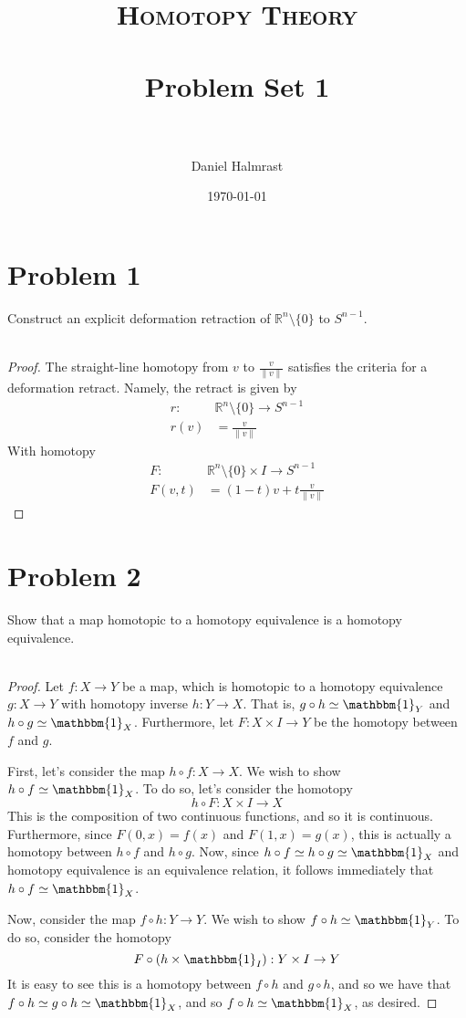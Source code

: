 \documentclass[fontsize=11pt]{scrartcl} %
\title{	
\normalfont \normalsize 
\textsc{Homotopy Theory} \\ [25pt] %
\horrule{0.5pt} \\[0.4cm] %
\huge Problem Set 1 \\ %
\horrule{2pt} \\[0.5cm] %
}
\author{Daniel Halmrast} %
\date{\normalsize\today} %
\numberwithin{equation}{section} %
\numberwithin{figure}{section} %
\numberwithin{table}{section} %
\newcommand{\R}{\mathbb{R}}
\begin{document}
\maketitle %

\section*{Problem 1} %
Construct an explicit deformation retraction of $\R^n\setminus \{0\}$ to
$S^{n-1}$.
\\
\\
\begin{proof}
    The straight-line homotopy from $v$ to $\frac{v}{\|v\|}$ satisfies the
    criteria for a deformation retract. Namely, the retract is given by
    \[
        \begin{aligned}
            r:&\R^n\setminus\{0\}\to S^{n-1}\\
            r(v) &= \frac{v}{\|v\|}
        \end{aligned}
    \]
    With homotopy
    \[
        \begin{aligned}
            F:&\R^n\setminus\{0\}\times I\to S^{n-1}\\
            F(v,t) &= (1-t)v + t\frac{v}{\|v\|}
        \end{aligned}
    \]
\end{proof}

\newpage

\section*{Problem 2} %
Show that a map homotopic to a homotopy equivalence is a homotopy equivalence.
\\
\\
\begin{proof}
    Let $f:X\to Y$ be a map, which is homotopic to a homotopy equivalence
    $g:X\to Y$ with homotopy inverse $h:Y\to X$. That is, $g\circ h \simeq
    \mathbbm{1}_Y$
    and $h\circ g \simeq \mathbbm{1}_X$. Furthermore, let $F:X\times I\to Y$ be the
    homotopy between $f$ and $g$.

    First, let's consider the map $h\circ f:X\to X$. We wish to show
    $h\circ f\simeq \mathbbm{1}_X$. To do so, let's consider the
    homotopy 
    \[
        h\circ F:X\times I\to X
    \]
    This is the composition of two continuous functions, and so it is
    continuous. Furthermore, since $F(0,x) = f(x)$ and $F(1,x)=g(x)$, this is
    actually a homotopy between $h\circ f$ and $h\circ g$. Now, since $h\circ
    f\simeq h\circ g\simeq \mathbbm{1}_X$ and homotopy equivalence is an
    equivalence relation, it follows immediately that $h\circ f\simeq
    \mathbbm{1}_X$.

    Now, consider the map $f\circ h:Y\to Y$. We wish to show $f\circ h\simeq
    \mathbbm{1}_Y$. To do so, consider the homotopy 
    \[
        F\circ(h\times \mathbbm{1}_I): Y\times I\to Y
    \]
    It is easy to see this is a homotopy between $f\circ h$ and $g\circ h$, and
    so we have that $f\circ h \simeq g\circ h \simeq \mathbbm{1}_X$, and so
    $f\circ h \simeq \mathbbm{1}_X$, as desired.
\end{proof}
\end{document}
